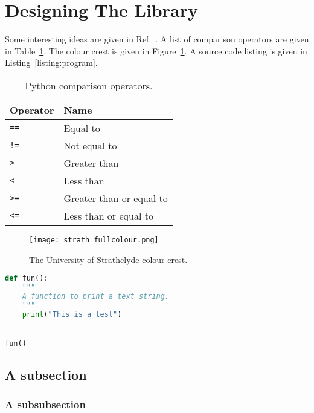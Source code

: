 \section{Designing The Library}
Some interesting ideas are given in Ref.~\cite{turing1950computing}.  A list of comparison operators are given in Table~\ref{table:comparison-operators}.  The colour crest is given in Figure~\ref{figure:colour-crest}.  A source code listing is given in Listing~\ref{listing:program}.

\begin{table}[h!!]
  \begin{center}
    \caption{Python comparison operators.}
    \label{table:comparison-operators}
    \begin{tabular}{l|l} \hline
      \textbf{Operator} & \textbf{Name}\\
      \hline
      \texttt{==} & Equal to\\
      \texttt{!=} & Not equal to\\
      \texttt{>} & Greater than\\
      \texttt{<} & Less than\\
      \texttt{>=} & Greater than or equal to\\
      \texttt{<=} & Less than or equal to\\ \hline
    \end{tabular}
  \end{center}
\end{table}

\begin{figure}[h!!]
  \begin{center}
    \texttt{[image: strath\_fullcolour.png]}
    \caption{The University of Strathclyde colour crest.}
    \label{figure:colour-crest}
  \end{center}
\end{figure}

\begin{singlespacing}
\begin{lstlisting}[language=python,caption={Demonstrating source code listing.},label=listing:program]
def fun():
    """
    A function to print a text string.
    """
    print("This is a test")


fun()
\end{lstlisting}
\end{singlespacing}

\lipsum[1-2]
\subsection{A subsection}
\lipsum[1-2]
\subsubsection{A subsubsection}
\lipsum[1-2]
